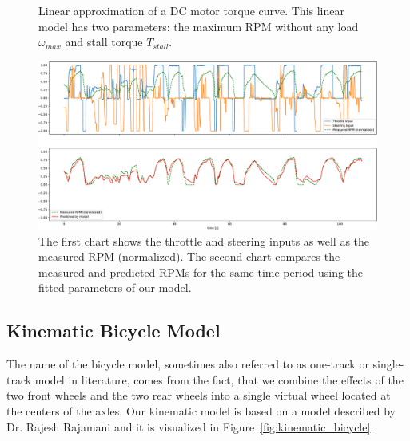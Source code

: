 \begin{figure}[b]
	\centering
	
	
	\caption{Linear approximation of a DC motor torque curve. This linear model has two parameters: the maximum RPM without any load $\omega_{max}$ and stall torque $T_{stall}$.}
	\label{fig:torque_rpm_curve}
\end{figure}

\begin{figure}[b]
	\centering
	\includegraphics[width=\textwidth]{../img/fit_8000}
	\caption{The first chart shows the throttle and steering inputs as well as the measured RPM (normalized). The second chart compares the measured and predicted RPMs for the same time period using the fitted parameters of our model.}
	\label{fig:motor_rpm_model}
\end{figure}

\subsection{Kinematic Bicycle Model}

The name of the bicycle model, sometimes also referred to as one-track or single-track model in literature, comes from the fact, that we combine the effects of the two front wheels and the two rear wheels into a single virtual wheel located at the centers of the axles. Our kinematic model is based on a model described by Dr. Rajesh Rajamani \cite[Chapter~2]{rajamani} and it is visualized in Figure~\ref{fig:kinematic_bicycle}.

